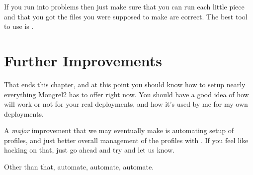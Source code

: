 If you run into problems then just make sure that you can run each little
piece and that you got the files you were supposed to make are correct.
The best tool to use is .

\section{Further Improvements}


That ends this chapter, and at this point you should know how to setup
nearly everything Mongrel2 has to offer right now.  You should have a good
idea of how  will work or not for your real deployments, and
how it's used by me for my own deployments.

A \emph{major} improvement that we may eventually make is automating
setup of  profiles, and just better overall management
of the profiles with .  If you feel like hacking on that,
just go ahead and try and let us know.

Other than that, automate, automate, automate.


